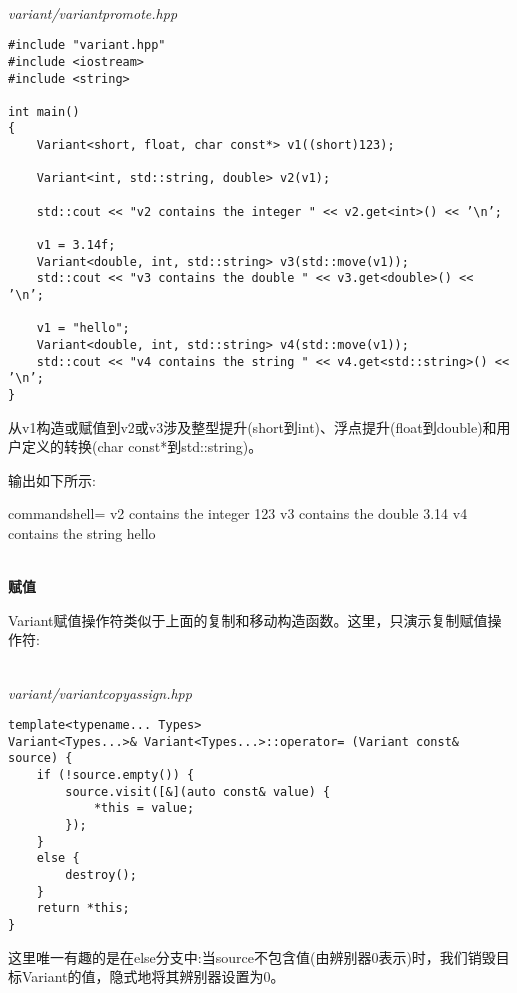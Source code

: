 \hspace*{\fill} \\ %
\noindent
\textit{variant/variantpromote.hpp}
\begin{lstlisting}[style=styleCXX]
#include "variant.hpp"
#include <iostream>
#include <string>

int main()
{
	Variant<short, float, char const*> v1((short)123);
	
	Variant<int, std::string, double> v2(v1);
	
	std::cout << "v2 contains the integer " << v2.get<int>() << ’\n’;
	
	v1 = 3.14f;
	Variant<double, int, std::string> v3(std::move(v1));
	std::cout << "v3 contains the double " << v3.get<double>() << ’\n’;
	
	v1 = "hello";
	Variant<double, int, std::string> v4(std::move(v1));
	std::cout << "v4 contains the string " << v4.get<std::string>() << ’\n’;
}
\end{lstlisting}

从v1构造或赋值到v2或v3涉及整型提升(short到int)、浮点提升(float到double)和用户定义的转换(char const*到std::string)。

输出如下所示:

\begin{tcblisting}{commandshell={}}
v2 contains the integer 123
v3 contains the double 3.14
v4 contains the string hello
\end{tcblisting}

\hspace*{\fill} \\ %
\noindent
\textbf{赋值}

Variant赋值操作符类似于上面的复制和移动构造函数。这里，只演示复制赋值操作符:

\hspace*{\fill} \\ %
\noindent
\textit{variant/variantcopyassign.hpp}
\begin{lstlisting}[style=styleCXX]
template<typename... Types>
Variant<Types...>& Variant<Types...>::operator= (Variant const& source) {
	if (!source.empty()) {
		source.visit([&](auto const& value) {
			*this = value;
		});
	}
	else {
		destroy();
	}
	return *this;
}
\end{lstlisting}

这里唯一有趣的是在else分支中:当source不包含值(由辨别器0表示)时，我们销毁目标Variant的值，隐式地将其辨别器设置为0。


















